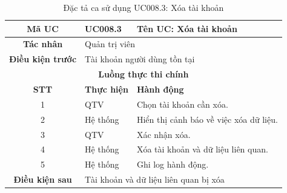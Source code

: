 \begin{table}[H]
    \centering
    \label{tab:uc008-3}
    \begin{tabularx}{\textwidth}{|c|p{3.5cm}|X|}
        \hline
        \rowcolor{headergreen} 
        \textbf{Mã UC} & \textbf{UC008.3} & \textbf{Tên UC: Xóa tài khoản} \\ \hline
        \textbf{Tác nhân} & \multicolumn{2}{l|}{Quản trị viên} \\ \hline
        \textbf{Điều kiện trước} & \multicolumn{2}{X|}{Tài khoản người dùng tồn tại} \\ \hline
        
        \multicolumn{3}{|c|}{\cellcolor{headerorange}\textbf{Luồng thực thi chính}} \\ \hline
        \rowcolor{graybg} \textbf{STT} & \textbf{Thực hiện} & \textbf{Hành động} \\ \hline
        1 & QTV & Chọn tài khoản cần xóa. \\ \hline
        2 & Hệ thống & Hiển thị cảnh báo về việc xóa dữ liệu. \\ \hline
        3 & QTV & Xác nhận xóa. \\ \hline
        4 & Hệ thống & Xóa tài khoản và dữ liệu liên quan. \\ \hline
        5 & Hệ thống & Ghi log hành động. \\ \hline
        
        \textbf{Điều kiện sau} & \multicolumn{2}{X|}{Tài khoản và dữ liệu liên quan bị xóa} \\ \hline
    \end{tabularx}
    \caption{Đặc tả ca sử dụng UC008.3: Xóa tài khoản}
\end{table}


